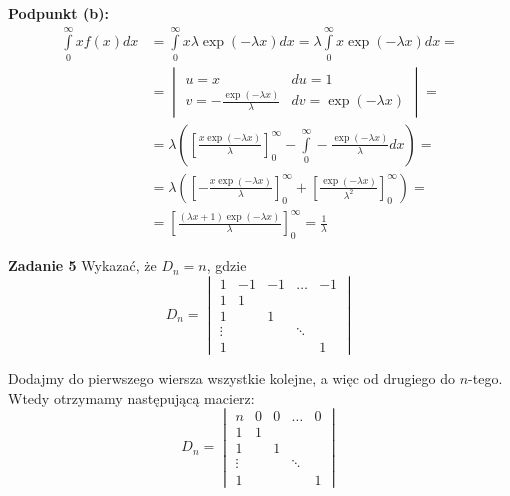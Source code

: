 \documentclass[a4paper,12pt]{article}
\begin{document}
\noindent \textbf{Podpunkt (b):}
\begin{align*}
    \int\limits_{0}^{\infty} x f(x) dx &= 
        \int\limits_{0}^{\infty} x \lambda \exp (-\lambda x) dx =
        \lambda \int\limits_{0}^{\infty} x \exp (-\lambda x) dx = \\
    &= 
    \begin{vmatrix}
        u = x                                   &   du = 1   \\
        v = -\frac{\exp(-\lambda x)}{\lambda}   &   dv = \exp(-\lambda x)
    \end{vmatrix} = \\ 
    &= \lambda \left( 
            \left[ \frac{x \exp(-\lambda x)}{\lambda} \right]_0^\infty 
            - \int\limits_{0}^{\infty} -\frac{\exp(-\lambda x)}{\lambda} dx 
        \right) = \\
    &= \lambda \left(
        \left[ - \frac{x\exp(-\lambda x)}{\lambda} \right]_0^\infty
        + \left[ \frac{\exp(-\lambda x)}{\lambda^2} \right]_0^\infty
    \right) = \\
    &= \left[ \frac{(\lambda x + 1) \exp(-\lambda x)}{\lambda} \right]_0^\infty =
        \frac{1}{\lambda}
\end{align*}

\noindent \textbf{Zadanie 5} \newline
Wykazać, że $D_n = n$, gdzie
\[
    D_n =
    \begin{vmatrix}
        1       & -1    & -1    & \dots     & -1    \\
        1       &  1    &       &           &       \\
        1       &       &  1    &           &       \\
        \vdots  &       &       & \ddots    &       \\
        1       &       &       &           & 1    
    \end{vmatrix}
\]

\noindent Dodajmy do pierwszego wiersza wszystkie kolejne, a więc od drugiego do
$n$-tego. Wtedy otrzymamy następującą macierz:
\[
    D_n =
    \begin{vmatrix}
        n       &  0    &  0    & \dots     & 0     \\
        1       &  1    &       &           &       \\
        1       &       &  1    &           &       \\
        \vdots  &       &       & \ddots    &       \\
        1       &       &       &           & 1    
    \end{vmatrix}
\]
\end{document}
